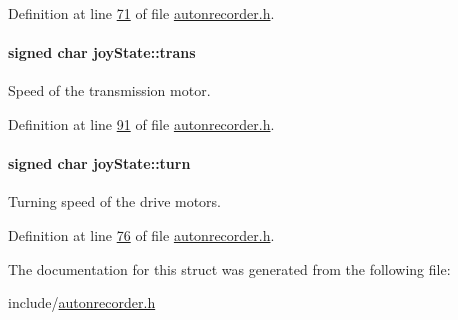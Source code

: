 Definition at line \hyperlink{autonrecorder_8h_source_l00071}{71} of file \hyperlink{autonrecorder_8h_source}{autonrecorder.\+h}.

\paragraph[{\texorpdfstring{trans}{trans}}]{\setlength{\rightskip}{0pt plus 5cm}signed char joy\+State\+::trans}\hypertarget{structjoy_state_acc4f7bae078e8c8b7840cda61382c7cf}{}\label{structjoy_state_acc4f7bae078e8c8b7840cda61382c7cf}
Speed of the transmission motor. 

Definition at line \hyperlink{autonrecorder_8h_source_l00091}{91} of file \hyperlink{autonrecorder_8h_source}{autonrecorder.\+h}.

\paragraph[{\texorpdfstring{turn}{turn}}]{\setlength{\rightskip}{0pt plus 5cm}signed char joy\+State\+::turn}\hypertarget{structjoy_state_aacdbb758b97190220423402f63020483}{}\label{structjoy_state_aacdbb758b97190220423402f63020483}
Turning speed of the drive motors. 

Definition at line \hyperlink{autonrecorder_8h_source_l00076}{76} of file \hyperlink{autonrecorder_8h_source}{autonrecorder.\+h}.



The documentation for this struct was generated from the following file\+:\begin{DoxyCompactItemize}
\item 
include/\hyperlink{autonrecorder_8h}{autonrecorder.\+h}\end{DoxyCompactItemize}
